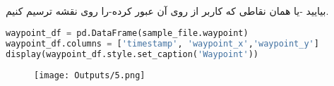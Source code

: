 \documentclass{article}
\begin{document}
\subsection*{}
بیایید -یا همان نقاطی که کاربر از روی آن عبور کرده-را روی نقشه ترسیم کنیم.
\begin{latin}
\begin{lstlisting}[language=Python]
waypoint_df = pd.DataFrame(sample_file.waypoint)
waypoint_df.columns = ['timestamp', 'waypoint_x','waypoint_y']
display(waypoint_df.style.set_caption('Waypoint'))
\end{lstlisting}
\end{latin}
\begin{figure}[hbt!]
	\centering
	\texttt{[image: Outputs/5.png]}
\end{figure}
\ \\
\end{document}
